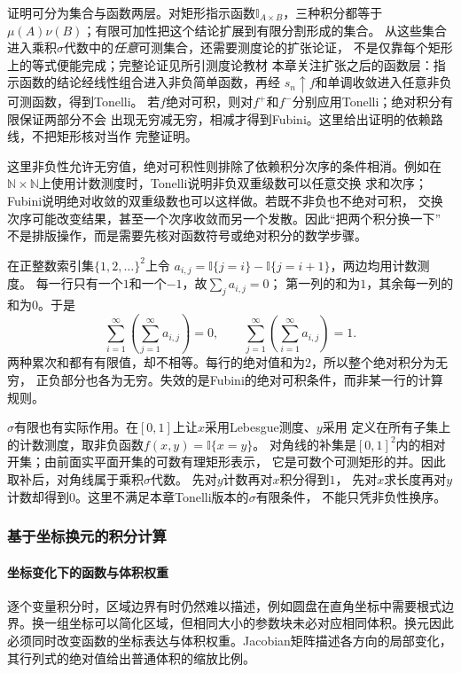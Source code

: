 证明可分为集合与函数两层。对矩形指示函数$\mathbb I_{A\times B}$，三种积分都等于
$\mu(A)\nu(B)$；有限可加性把这个结论扩展到有限分割形成的集合。
从这些集合进入乘积$\sigma$代数中的\emph{任意}可测集合，还需要测度论的扩张论证，
不是仅靠每个矩形上的等式便能完成；完整论证见所引测度论教材
本章关注扩张之后的函数层：指示函数的结论经线性组合进入非负简单函数，再经
$s_n\uparrow f$和单调收敛进入任意非负可测函数，得到Tonelli。
若$f$绝对可积，则对$f^+$和$f^-$分别应用Tonelli；绝对积分有限保证两部分不会
出现无穷减无穷，相减才得到Fubini。这里给出证明的依赖路线，不把矩形核对当作
完整证明。

这里非负性允许无穷值，绝对可积性则排除了依赖积分次序的条件相消。例如在
$\mathbb{N}\times\mathbb{N}$上使用计数测度时，Tonelli说明非负双重级数可以任意交换
求和次序；Fubini说明绝对收敛的双重级数也可以这样做。若既不非负也不绝对可积，
交换次序可能改变结果，甚至一个次序收敛而另一个发散。因此“把两个积分换一下”
不是排版操作，而是需要先核对函数符号或绝对积分的数学步骤。

\begin{example}[行列各自可加仍不足以换序]
\label{ex:analysis-iterated-sum-failure}
在正整数索引集$\{1,2,\ldots\}^2$上令
$a_{i,j}=\mathbb I\{j=i\}-\mathbb I\{j=i+1\}$，两边均用计数测度。
每一行只有一个$1$和一个$-1$，故$\sum_j a_{i,j}=0$；
第一列的和为$1$，其余每一列的和为$0$。于是
\[
 \sum_{i=1}^{\infty}\left(\sum_{j=1}^{\infty}a_{i,j}\right)=0,
 \qquad
 \sum_{j=1}^{\infty}\left(\sum_{i=1}^{\infty}a_{i,j}\right)=1.
\]
两种累次和都有有限值，却不相等。每行的绝对值和为$2$，所以整个绝对积分为无穷，
正负部分也各为无穷。失效的是Fubini的绝对可积条件，而非某一行的计算规则。
\end{example}

$\sigma$有限也有实际作用。在$[0,1]$上让$x$采用Lebesgue测度、$y$采用
定义在所有子集上的计数测度，取非负函数$f(x,y)=\mathbb I\{x=y\}$。
对角线的补集是$[0,1]^2$内的相对开集；由前面实平面开集的可数有理矩形表示，
它是可数个可测矩形的并。因此取补后，对角线属于乘积$\sigma$代数。
先对$y$计数再对$x$积分得到$1$，
先对$x$求长度再对$y$计数却得到$0$。这里不满足本章Tonelli版本的$\sigma$有限条件，
不能只凭非负性换序。

\subsubsection{基于坐标换元的积分计算}
\label{sec:analysis-coordinate-change-integral-applications}
\paragraph{坐标变化下的函数与体积权重}
逐个变量积分时，区域边界有时仍然难以描述，例如圆盘在直角坐标中需要根式边界。换一组坐标可以简化区域，但相同大小的参数块未必对应相同体积。换元因此必须同时改变函数的坐标表达与体积权重。Jacobian矩阵描述各方向的局部变化，其行列式的绝对值给出普通体积的缩放比例。

